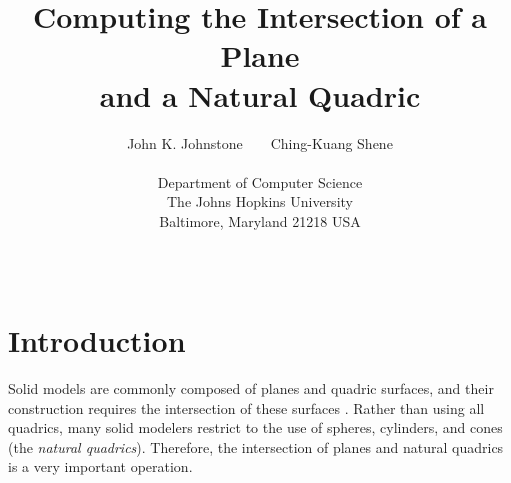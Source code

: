 
\newif\ifFull
\Fulltrue

\def\thefootnote{\fnsymbol{footnote}}

\title{
     Computing the Intersection of a Plane \\
     and a Natural Quadric\footnotemark[1]}

\author{John K. Johnstone\ \ \ \ Ching-Kuang Shene\\ \\
          Department of Computer Science\\
          The Johns Hopkins University \\
          Baltimore, Maryland 21218  USA}

\date{\ }

\newtheorem{example}{Example}[section]
\newtheorem{property}{Property}[section]
\newtheorem{definition}{Definition}[section]
\newtheorem{theorem}{Theorem}[section]
\newtheorem{lemma}{Lemma}[section]
\newtheorem{corollary}{Corollary}[section]

\newcommand{\DoubleSpace}{\edef\baselinestretch{1.4}\Large\normalsize}
\newcommand{\QED}{\ \ \ \rule{2mm}{3mm}\\}
\newcommand{\arrow}[1]{\vec{\bf #1}}

\DoubleSpace
\setlength{\oddsidemargin}{0pt}
\setlength{\evensidemargin}{0pt}
\setlength{\headsep}{0pt}
\setlength{\topmargin}{0pt}
\setlength{\textheight}{8.75in}
\setlength{\textwidth}{6.5in}



\maketitle
{}

\def\thefootnote{\arabic{footnote}}
\setcounter{footnote}{0}


\section{Introduction}

Solid models are commonly composed of planes and quadric surfaces,
and their construction requires the intersection of these surfaces
\cite{HOF89,MANT88}.
Rather than using all quadrics, 
many solid modelers restrict to the use of spheres, cylinders,
and cones (the {\em natural quadrics}).
Therefore, the intersection of planes and natural quadrics is a very important
operation.


